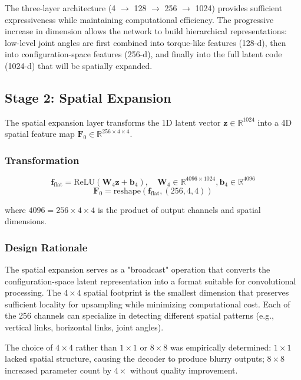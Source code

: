 ﻿\documentclass[12pt,a4paper,oneside]{report}
\begin{document}
The three-layer architecture (4 $\rightarrow$ 128 $\rightarrow$ 256 $\rightarrow$ 1024) provides sufficient expressiveness while maintaining computational efficiency. The progressive increase in dimension allows the network to build hierarchical representations: low-level joint angles are first combined into torque-like features (128-d), then into configuration-space features (256-d), and finally into the full latent code (1024-d) that will be spatially expanded.

\subsection{Stage 2: Spatial Expansion}

The spatial expansion layer transforms the 1D latent vector $\mathbf{z} \in \mathbb{R}^{1024}$ into a 4D spatial feature map $\mathbf{F}_0 \in \mathbb{R}^{256 \times 4 \times 4}$.

\subsubsection{Transformation}

\begin{equation}
\mathbf{f}_{\text{flat}} = \text{ReLU}(\mathbf{W}_4 \mathbf{z} + \mathbf{b}_4), \quad \mathbf{W}_4 \in \mathbb{R}^{4096 \times 1024}, \mathbf{b}_4 \in \mathbb{R}^{4096}
\end{equation}
\begin{equation}
\mathbf{F}_0 = \text{reshape}(\mathbf{f}_{\text{flat}}, (256, 4, 4))
\end{equation}

where $4096 = 256 \times 4 \times 4$ is the product of output channels and spatial dimensions.

\subsubsection{Design Rationale}

The spatial expansion serves as a "broadcast" operation that converts the configuration-space latent representation into a format suitable for convolutional processing. The $4 \times 4$ spatial footprint is the smallest dimension that preserves sufficient locality for upsampling while minimizing computational cost. Each of the 256 channels can specialize in detecting different spatial patterns (e.g., vertical links, horizontal links, joint angles).

The choice of $4 \times 4$ rather than $1 \times 1$ or $8 \times 8$ was empirically determined: $1 \times 1$ lacked spatial structure, causing the decoder to produce blurry outputs; $8 \times 8$ increased parameter count by $4\times$ without quality improvement.
\end{document}
